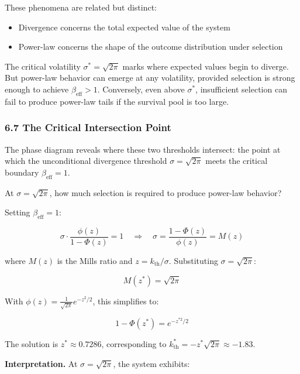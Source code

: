 \documentclass[
  11pt,
  openany]{article}
\providecommand{\tightlist}{%
  \setlength{\itemsep}{0pt}\setlength{\parskip}{0pt}}
\providecommand{\tightlist}{%
  \setlength{\itemsep}{0pt}\setlength{\parskip}{0pt}}
\begin{document}
These phenomena are related but distinct:

\begin{itemize}
\tightlist
\item
  Divergence concerns the total expected value of the system
\item
  Power-law concerns the shape of the outcome distribution under
  selection
\end{itemize}

The critical volatility \(\sigma^* = \sqrt{2\pi}\) marks where expected
values begin to diverge. But power-law behavior can emerge at any
volatility, provided selection is strong enough to achieve
\(\beta_{\text{eff}} > 1\). Conversely, even above \(\sigma^*\),
insufficient selection can fail to produce power-law tails if the
survival pool is too large.

\subsubsection{6.7 The Critical Intersection
Point}\label{the-critical-intersection-point}

The phase diagram reveals where these two thresholds intersect: the
point at which the unconditional divergence threshold
\(\sigma = \sqrt{2\pi}\) meets the critical boundary
\(\beta_{\text{eff}} = 1\).

At \(\sigma = \sqrt{2\pi}\), how much selection is required to produce
power-law behavior?

Setting \(\beta_{\text{eff}} = 1\):

\[\sigma \cdot \frac{\phi(z)}{1 - \Phi(z)} = 1 \quad \Rightarrow \quad \sigma = \frac{1 - \Phi(z)}{\phi(z)} = M(z)\]

where \(M(z)\) is the Mills ratio and \(z = k_{\text{th}}/\sigma\).
Substituting \(\sigma = \sqrt{2\pi}\):

\[M(z^*) = \sqrt{2\pi}\]

With \(\phi(z) = \frac{1}{\sqrt{2\pi}} e^{-z^2/2}\), this simplifies to:

\[1 - \Phi(z^*) = e^{-z^{*2}/2}\]

The solution is \(z^* \approx 0.7286\), corresponding to
\(k_{\text{th}}^* = -z^* \sqrt{2\pi} \approx -1.83\).

\textbf{Interpretation.} At \(\sigma = \sqrt{2\pi}\), the system
exhibits:
\end{document}
